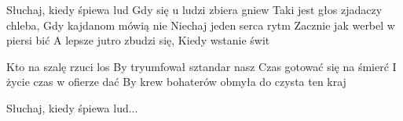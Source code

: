 \documentclass[../../../songbook.tex]{subfiles}
\begin{document}
\-\hspace{1cm} Słuchaj, kiedy śpiewa lud		 \newline
\-\hspace{1cm} Gdy się u ludzi zbiera gniew		 \newline
\-\hspace{1cm} Taki jest głos zjadaczy chleba,	 \newline
\-\hspace{1cm} Gdy kajdanom mówią nie			 \newline
\-\hspace{1cm} Niechaj jeden serca rytm			 \newline
\-\hspace{1cm} Zacznie jak werbel w piersi bić	 \newline
\-\hspace{1cm} A lepsze jutro zbudzi się, 		 \newline
\-\hspace{1cm} Kiedy wstanie świt				 \newline

Kto na szalę rzuci los \newline
By tryumfował sztandar nasz \newline
Czas gotować się na śmierć \newline
I życie czas w ofierze dać \newline
By krew bohaterów obmyła do czysta ten kraj \newline

\-\hspace{1cm} Słuchaj, kiedy śpiewa lud... \newline
\end{document}
